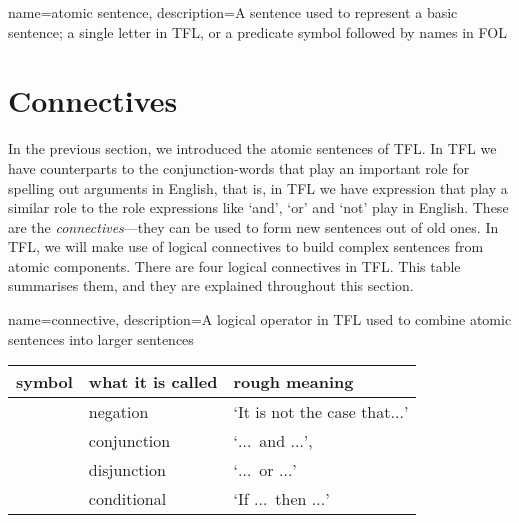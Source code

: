 {
name=atomic sentence,
description={A sentence used to represent a basic sentence; a single letter in TFL, or a predicate symbol followed by names in FOL}
}

\section{Connectives}
\label{s:TFLConnectives}

In the previous section, we introduced the atomic sentences of TFL.  In TFL we have counterparts to the conjunction-words that play an important role for spelling out arguments in English, that is, in TFL we have expression that play a similar role to the role expressions like `and', `or' and `not' play in English. These are the \emph{connectives}---they can be used to form new sentences out of old ones. In TFL, we will make use of logical connectives to build complex sentences from atomic components. There are four logical connectives in TFL. This table summarises them, and they are explained throughout this section.

{
name=connective,
description={A logical operator in TFL used to combine \glspl{atomic sentence} into larger sentences}
}
	\begin{table}[h]
	\center
	\begin{tabular}{l l l}

	\textbf{symbol}&\textbf{what it is called}&\textbf{rough meaning}\\
	\hline
	\enot&negation&`It is not the case that$\ldots$'\\
	\eand&conjunction&`$\ldots$\ and $\ldots$',\\
	\eor&disjunction&`$\ldots$\ or $\ldots$'\\
	\eif&conditional&`If $\ldots$\ then $\ldots$'\\

	\end{tabular}
	\end{table}


